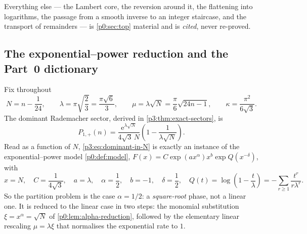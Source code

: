 \documentclass[11pt,a4paper,oneside]{book}
\theoremstyle{plain}
\theoremstyle{definition}
\theoremstyle{remark}
\newcommand{\e}{\mathrm{e}}
\begin{document}
Everything else --- the Lambert core, the reversion around it, the flattening into logarithms, the
passage from a smooth inverse to an integer staircase, and the transport of remainders --- is
\cref{p0:sec:top} material and is \emph{cited}, never re-proved.

\subsection{The exponential--power reduction and the Part~0 dictionary}
\label{p3:sub:dictionary}

Fix throughout
\begin{equation}\label{p3:eq:master-variables}
 N=n-\frac1{24},\qquad
 \lambda=\pi\sqrt{\frac23}=\frac{\pi\sqrt6}{3},\qquad
 \mu=\lambda\sqrt N=\frac\pi6\sqrt{24n-1},\qquad
 \kappa=\frac{\pi^2}{6\sqrt3}.
\end{equation}
The dominant Rademacher sector, derived in \cref{p3:thm:exact-sectors}, is
\begin{equation}\label{p3:eq:dominant-in-N}
 P_{1,+}(n)=\frac{\e^{\lambda\sqrt N}}{4\sqrt3\,N}
 \left(1-\frac1{\lambda\sqrt N}\right).
\end{equation}
Read as a function of $N$, \cref{p3:eq:dominant-in-N} is exactly an instance of the
exponential--power model \cref{p0:def:model}, $F(x)=C\exp(ax^{\alpha})x^{b}\exp Q(x^{-\delta})$,
with
\begin{equation}\label{p3:eq:model-in-N}
 x=N,\quad C=\frac1{4\sqrt3},\quad a=\lambda,\quad \alpha=\frac12,\quad
 b=-1,\quad \delta=\frac12,\quad
 Q(t)=\log\!\left(1-\frac{t}{\lambda}\right)
      =-\sum_{r\ge1}\frac{t^{r}}{r\lambda^{r}} .
\end{equation}
So the partition problem is the case $\alpha=1/2$: a \emph{square-root} phase, not a linear one.
It is reduced to the linear case in two steps: the monomial substitution
$\xi=x^{\alpha}=\sqrt N$ of \cref{p0:lem:alpha-reduction}, followed by the elementary linear
rescaling $\mu=\lambda\xi$ that normalises the exponential rate to $1$.
\end{document}
